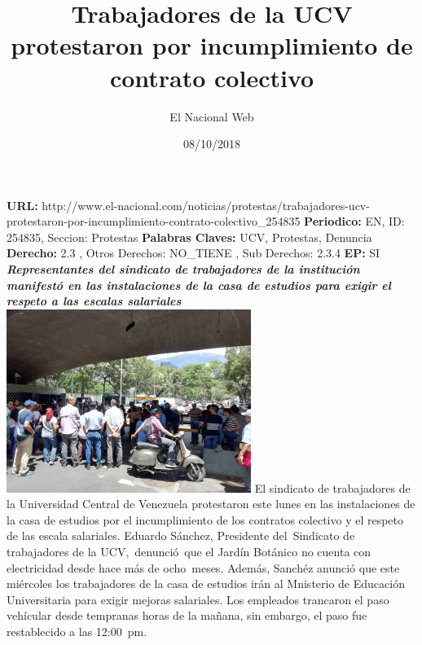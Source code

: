 \documentclass{article}%
\title{\textbf{Trabajadores de la UCV protestaron por incumplimiento de contrato colectivo}}%
\author{El Nacional Web}%
\date{08/10/2018}%
\begin{document}
%
\normalsize%
\maketitle%
\textbf{URL: }%
http://www.el{-}nacional.com/noticias/protestas/trabajadores{-}ucv{-}protestaron{-}por{-}incumplimiento{-}contrato{-}colectivo\_254835\newline%
%
\textbf{Periodico: }%
EN, %
ID: %
254835, %
Seccion: %
Protestas\newline%
%
\textbf{Palabras Claves: }%
UCV, Protestas, Denuncia\newline%
%
\textbf{Derecho: }%
2.3%
, Otros Derechos: %
NO\_TIENE%
, Sub Derechos: %
2.3.4%
\newline%
%
\textbf{EP: }%
SI\newline%
\newline%
%
\textbf{\textit{Representantes del sindicato de trabajadores de la institución manifestó en las instalaciones de la casa de estudios para exigir el respeto a las escalas salariales}}%
\newline%
\newline%
%
\includegraphics[width=300px]{3.jpg}%
\newline%
%
El sindicato de trabajadores de la Universidad Central de Venezuela protestaron este lunes en las instalaciones de la casa de estudios por el incumplimiento de los contratos colectivo y el respeto de las escala salariales.%
\newline%
%
Eduardo Sánchez, Presidente del~Sindicato de trabajadores de la UCV,~denunció~que el Jardín Botánico no cuenta con electricidad desde hace más de ocho~meses.%
\newline%
%
Además, Sanchéz anunció que este miércoles los trabajadores de la casa de estudios irán al Mnisterio de Educación Universitaria para exigir mejoras salariales.%
\newline%
%
Los empleados trancaron el paso vehícular desde tempranas horas de la mañana, sin embargo, el paso fue restablecido a las 12:00~pm.%
\newline%
%
\end{document}
